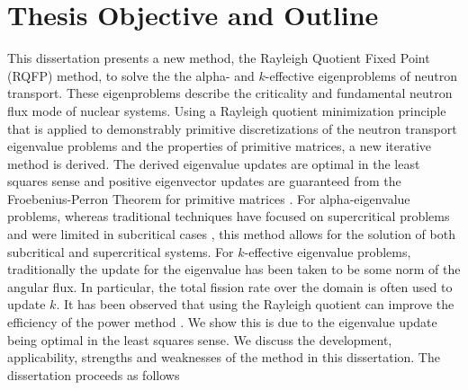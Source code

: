 \section{Thesis Objective and Outline}
This dissertation presents a new method, the Rayleigh Quotient Fixed Point (RQFP) method, to solve the the alpha- and $k$-effective eigenproblems of neutron transport. These eigenproblems describe the criticality and fundamental neutron flux mode of nuclear systems. Using a Rayleigh quotient minimization principle that is applied to demonstrably primitive discretizations of the neutron transport eigenvalue problems and the properties of primitive matrices, a new iterative method is derived. The derived eigenvalue updates are optimal in the least squares sense and positive eigenvector updates are guaranteed from the Froebenius-Perron Theorem for primitive matrices \cite{birkhoff_reactor_1958}. For alpha-eigenvalue problems, whereas traditional techniques have focused on supercritical problems and were limited in subcritical cases \cite{hill_efficient_1983}, this method allows for the solution of both subcritical and supercritical systems. For $k$-effective eigenvalue problems, traditionally the update for the eigenvalue has been taken to be some norm of the angular flux. In particular, the total fission rate over the domain is often used to update $k$. It has been observed that using the Rayleigh quotient can improve the efficiency of the power method \cite{warsa2004krylov}. We show this is due to the eigenvalue update being optimal in the least squares sense. 
We discuss the development, applicability, strengths and weaknesses of the method in this dissertation. The dissertation proceeds as follows


